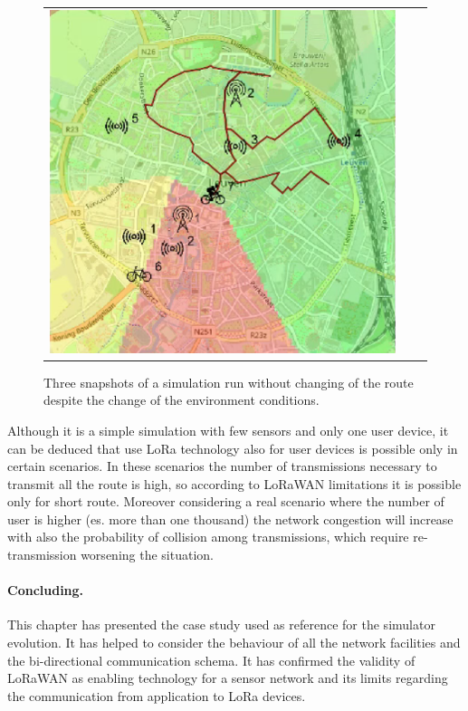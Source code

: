 \begin{figure}[h]
\begin{tabular}{lll}
         \includegraphics[scale=0.42]{figures/sim2snap3.png} 
    \end{tabular}
    \caption[Three snapshots of a simulation run without changing of the route]{Three snapshots of a simulation run without changing of the route despite the change of the environment conditions.}
    \label{fig:sim2}
\end{figure}
% 

Although it is a simple simulation with few sensors and only one user device, it can be deduced that use LoRa technology also for user devices is possible only in certain scenarios.
In these scenarios the number of transmissions necessary to transmit all the route is high, so according to LoRaWAN limitations it is possible only for short route.
Moreover considering a real scenario where the number of user is higher (es. more than one thousand) the network congestion will increase with also the probability of collision among transmissions, which require re-transmission worsening the situation.

\paragraph{Concluding.} This chapter has presented the case study used as reference for the simulator evolution.
It has helped to consider the behaviour of all the network facilities and the bi-directional communication schema.
It has confirmed the validity of LoRaWAN as enabling technology for a sensor network and its limits regarding the communication from application to LoRa devices.